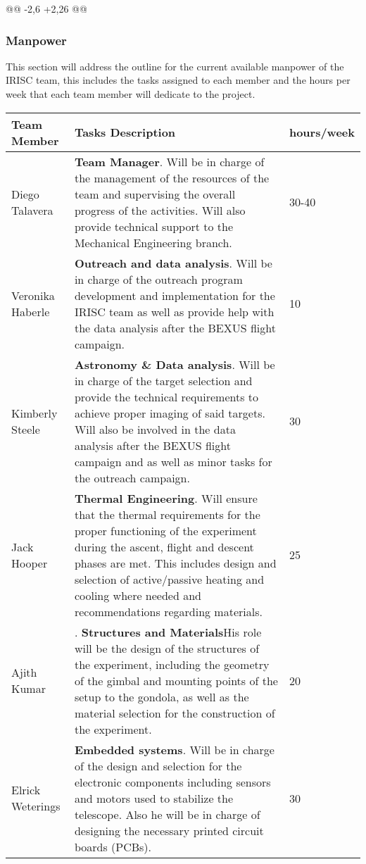 @@ -2,6 +2,26 @@

\subsubsection{Manpower}

This section will address the outline for the current available manpower of the IRISC team, this includes the tasks assigned to each member and the hours per week that each team member will dedicate to the project.

\begin{longtable}{m{} | m{} | m{}}
	\textbf{Team Member} & \textbf{Tasks Description} & \textbf{hours/week} \\ \hline
	Diego Talavera  & \textbf{Team Manager}. Will be in charge of the management of the resources of the team and supervising the overall progress of the activities. Will also provide technical support to the Mechanical Engineering branch. &  30-40 \\ \hline
	Veronika Haberle & \textbf{Outreach and data analysis}. Will be in charge of the outreach program development and implementation for the IRISC team as well as provide help with the data analysis after the BEXUS flight campaign. & 10 \\ \hline
	Kimberly Steele & \textbf{Astronomy \& Data analysis}. Will be in charge of the target selection and provide the technical requirements to achieve proper imaging of said targets. Will also be involved in the data analysis after the BEXUS flight campaign and as well as minor tasks for the outreach campaign. & 30 \\ \hline
	Jack Hooper & \textbf{Thermal Engineering}. Will ensure that the thermal requirements for the proper functioning of the experiment during the ascent, flight and descent phases are met. This includes design and selection of active/passive heating and cooling where needed and recommendations regarding materials. & 25 \\ \hline
	Ajith Kumar & . \textbf{Structures and Materials}His role will be the design of the structures of the experiment, including the geometry of the gimbal and mounting points of the setup to the gondola, as well as the material selection for the construction of the experiment. & 20 \\ \hline
	Elrick Weterings & \textbf{Embedded systems}. Will be in charge of the design and selection for the electronic components including sensors and motors used to stabilize the telescope. Also he will be in charge of designing the necessary printed circuit boards (PCBs). & 30 \\ \hline

\end{longtable}
